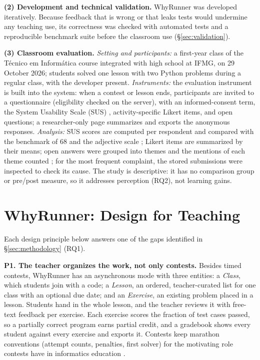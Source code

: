 \documentclass[12pt]{article}
\begin{document}
\textbf{(2) Development and technical validation.} WhyRunner was developed iteratively. Because feedback that is wrong or that leaks tests would undermine any teaching use, its correctness was checked with automated tests and a reproducible benchmark suite before the classroom use (\S\ref{sec:validation}).

\textbf{(3) Classroom evaluation.} \emph{Setting and participants:} a first-year class of the Técnico em Informática course integrated with high school at IFMG, on 29 October 2026; students solved one lesson with two Python problems during a regular class, with the developer present. \emph{Instruments:} the evaluation instrument is built into the system: when a contest or lesson ends, participants are invited to a questionnaire (eligibility checked on the server), with an informed-consent term, the System Usability Scale (SUS) \cite{brooke1996sus}, activity-specific Likert items, and open questions; a researcher-only page summarizes and exports the anonymous responses. \emph{Analysis:} SUS scores are computed per respondent and compared with the benchmark of 68 \cite{sauro2011sus} and the adjective scale \cite{bangor2009sus}; Likert items are summarized by their means; open answers were grouped into themes and the mentions of each theme counted \cite{braun2006thematic}; for the most frequent complaint, the stored submissions were inspected to check its cause. The study is descriptive: it has no comparison group or pre/post measure, so it addresses perception (RQ2), not learning gains.

\section{WhyRunner: Design for Teaching}\label{sec:design}

Each design principle below answers one of the gaps identified in \S\ref{sec:methodology} (RQ1).

\textbf{P1. The teacher organizes the work, not only contests.}\label{sec:class-lesson-model} Besides timed contests, WhyRunner has an asynchronous mode with three entities: a \emph{Class}, which students join with a code; a \emph{Lesson}, an ordered, teacher-curated list for one class with an optional due date; and an \emph{Exercise}, an existing problem placed in a lesson. Students hand in the whole lesson, and the teacher reviews it with free-text feedback per exercise. Each exercise scores the fraction of test cases passed, so a partially correct program earns partial credit, and a gradebook shows every student against every exercise and exports it. Contests keep marathon conventions (attempt counts, penalties, first solver) for the motivating role contests have in informatics education \cite{audrito2012contests}.
\end{document}
